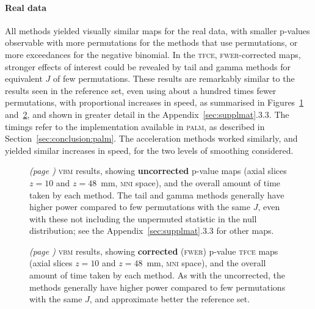 \paragraph{Real data} All methods yielded visually similar maps for the real data, with smaller p-values observable with more permutations for the methods that use permutations, or more exceedances for the negative binomial. In the \textsc{tfce}, \textsc{fwer}-corrected maps, stronger effects of interest could be revealed by tail and gamma methods for equivalent $J$ of few permutations. These results are remarkably similar to the results seen in the reference set, even using about a hundred times fewer permutations, with proportional increases in speed, as summarised in Figures~\ref{fig:vbm-vox-uncp} and~\ref{fig:vbm-tfce-fwep}, and shown in greater detail in the Appendix~\ref{sec:supplmat}.3.3. The timings refer to the implementation available in \textsc{palm}, as described in Section~\ref{sec:conclusion:palm}. The acceleration methods worked similarly, and yielded similar increases in speed, for the two levels of smoothing considered.

\begin{figure}[!b]
\centering
\caption[Uncorrected \textsc{vbm} results, showing the overall amount of time taken by each method.]{\emph{(page \pageref{fig:vbm-vox-uncp_noref})} \textsc{vbm} results, showing \textbf{uncorrected} p-value maps (axial slices $z=10$ and $z=48$~mm, \textsc{mni} space), and the overall amount of time taken by each method. The tail and gamma methods generally have higher power compared to few permutations with the same $J$, even with these not including the unpermuted statistic in the null distribution; see the Appendix~\ref{sec:supplmat}.3.3 for other maps.}
\label{fig:vbm-vox-uncp}
\end{figure}

\begin{figure}[!b]
\centering
\caption[Corrected \textsc{vbm} results, showing the overall amount of time taken by each method.]{\emph{(page \pageref{fig:vbm-tfce-fwep_noref})} \textsc{vbm} results, showing \textbf{corrected} (\textsc{fwer}) p-value \textsc{tfce} maps (axial slices $z=10$ and $z=48$~mm, \textsc{mni} space), and the overall amount of time taken by each method. As with the uncorrected, the methods generally have higher power compared to few permutations with the same $J$, and approximate better the reference set.}
\label{fig:vbm-tfce-fwep}
\end{figure}

